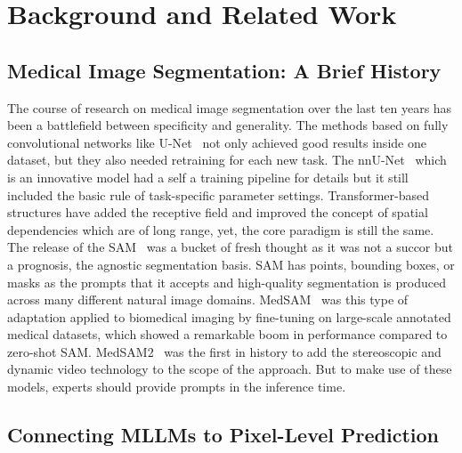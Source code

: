 \documentclass[12pt, a4paper]{article}
\begin{document}
\section{Background and Related Work}
\label{sec:background}

\subsection{Medical Image Segmentation: A Brief History}

The course of research on medical image segmentation over the last ten years has been
a battlefield between specificity and generality.
The methods based on fully convolutional networks like U-Net~\cite{unet} not only
achieved good results inside one dataset, but they also needed retraining for each new
task.
The nnU-Net~\cite{nnunet} which is an innovative model had a self a training pipeline
for details but it still included the basic rule of task-specific parameter settings.
Transformer-based structures have added the receptive field and improved the concept of
spatial dependencies which are of long range, yet, the core paradigm is still the same.
The release of the SAM~\cite{sam} was a bucket of fresh thought as it was not a succor
but a prognosis, the agnostic segmentation basis.
SAM has points, bounding boxes, or masks as the prompts that it accepts and
high-quality segmentation is produced across many different natural image domains.
MedSAM~\cite{medsam2} was this type of adaptation applied to biomedical imaging by
fine-tuning on large-scale annotated medical datasets, which showed a remarkable boom
in performance compared to zero-shot SAM.
MedSAM2~\cite{medsam2} was the first in history to add the stereoscopic and dynamic
video technology to the scope of the approach.
But to make use of these models, experts should provide prompts in the inference time.

\subsection{Connecting MLLMs to Pixel-Level Prediction}
\end{document}
